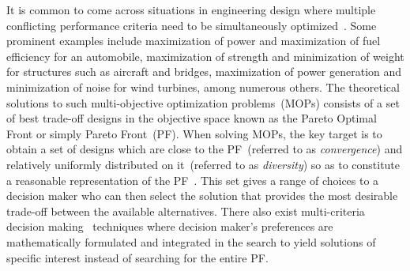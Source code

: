 \documentclass[twocolumn,10pt]{asme2ej}
\begin{document}
It is common to come across situations in engineering design where multiple conflicting performance criteria need to be simultaneously optimized~\cite{deb2001multi,Asafuddoula2015,KHTjmd2016,KHTjmd2017}. Some prominent examples include maximization of power and maximization of fuel efficiency for an automobile, maximization of strength and minimization of weight for structures such as aircraft and bridges, maximization of power generation and minimization of noise for wind turbines, among numerous others. The theoretical solutions to such multi-objective optimization problems~(MOPs) consists of a set of best trade-off designs in the objective space known as the Pareto Optimal Front or simply Pareto Front~(PF). When solving MOPs, the key target is to obtain a set of designs which are close to the PF~(referred to as \textit{convergence}) and relatively uniformly distributed on it~(referred to as \textit{diversity}) so as to constitute a reasonable representation of the PF~\cite{deb2001multi}. This set gives a range of choices to a decision maker who can then select the solution that provides the most desirable trade-off between the available alternatives. There also exist multi-criteria decision making~\cite{gal2013multicriteria} techniques where decision maker's preferences are mathematically formulated and integrated in the search to yield solutions of specific interest instead of searching for the entire PF.  
\end{document}

